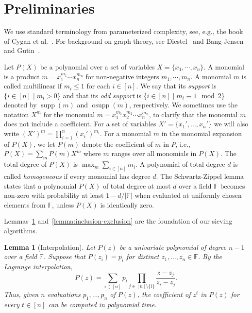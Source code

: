 \documentclass[10pt,a4paper]{article}
\newtheorem{lemma}{Lemma}[section]
\newcommand{\F}{\ensuremath{\mathbb F}\xspace}
\DeclareMathOperator{\supp}{supp}
\DeclareMathOperator{\osupp}{osupp}
\begin{document}
\section{Preliminaries}
\label{sec:prel}

We use standard terminology from parameterized complexity, see, e.g.,
the book of Cygan et al.~\cite{CyganFKLMPPS15PCbook}.
For background on graph theory, see Diestel~\cite{DiestelBook} and Bang-Jensen and Gutin~\cite{book-digraphs}.

Let $P(X)$ be a polynomial over a set of variables $X = \{ x_1, \cdots, x_n \}$.
A monomial is a product $m = x_1^{m_1} \cdots x_n^{m_n}$ for non-negative integers $m_1, \cdots, m_n$.
A monomial $m$ is called multilinear if $m_i \le 1$ for each $i \in [n]$.
We say that its \emph{support} is $\{ i \in [n] \mid m_i
> 0 \}$ and that its \emph{odd support} is $\{ i \in [n] \mid m_i \equiv 1 \mod 2 \}$ denoted by $\supp(m)$ and $\osupp(m)$, respectively. 
We sometimes use the notation $X^m$ for the monomial $m=x_1^{m_1} x_2^{m_2} \cdots x_n^{m_n}$,
to clarify that the monomial $m$ does not include a coefficient.
For a set of variables $X'=\{x_1',\ldots,x_n'\}$ we will also
write $(X')^m=\prod_{i=1}^n (x_i')^{m_i}$.
For a monomial $m$ in the monomial expansion of $P(X)$, we let $P(m)$ 
denote the coefficient of $m$ in $P$, i.e., $P(X)=\sum_m P(m) X^m$
where $m$ ranges over all monomials in $P(X)$.
The total degree of $P(X)$ is $\max_{m} \sum_{i \in [n]} m_i$.
A polynomial of total degree $d$ is called \emph{homogeneous} if every monomial has degree $d$.
The Schwartz-Zippel lemma \cite{Schwartz80,Zippel79} states that a polynomial $P(X)$ of total degree at most $d$ over a field $\F$ becomes non-zero with probability at least $1 - d / |\F|$ when evaluated at uniformly chosen elements from $\F$, unless $P(X)$ is identically zero.

Lemmas~\ref{lemma:interpolation0} and~\ref{lemma:inclusion-exclusion} are the foundation of our sieving algorithms.

\begin{lemma}[Interpolation]
  \label{lemma:interpolation0}
  Let $P(z)$ be a univariate polynomial of degree $n - 1$ over a field $\F$.
  Suppose that $P(z_i) = p_i$ for distinct $z_1, \dots, z_n \in \F$.
  By the Lagrange interpolation, 
  \[
    P(z)
    = \sum_{i \in [n]} p_i \prod_{j \in [n] \setminus \{ i \}} \frac{z - z_j}{z_i - z_j}.
  \]
  Thus, given $n$ evaluations $p_1, \dots, p_n$ of $P(z)$, the coefficient of $z^t$ in $P(z)$ for every $t \in [n]$ can be computed in polynomial time.
\end{lemma}
\end{document}
